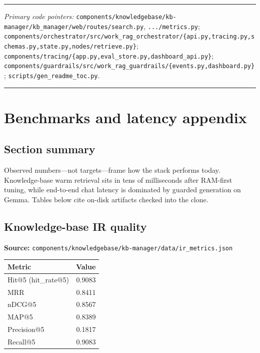 \documentclass[
  11pt,
]{article}
\begin{document}
\begin{center}\rule{0.5\linewidth}{0.5pt}\end{center}

\emph{Primary code pointers:}
\texttt{components/knowledgebase/kb-manager/kb\_manager/web/routes/search.py},
\texttt{.../metrics.py};
\texttt{components/orchestrator/src/work\_rag\_orchestrator/\{api.py,tracing.py,schemas.py,state.py,nodes/retrieve.py\}};
\texttt{components/tracing/\{app.py,eval\_store.py,dashboard\_api.py\}};
\texttt{components/guardrails/src/work\_rag\_guardrails/\{events.py,dashboard.py\}};
\texttt{scripts/gen\_readme\_toc.py}.

\begin{center}\rule{0.5\linewidth}{0.5pt}\end{center}

\section{Benchmarks and latency
appendix}\label{benchmarks-and-latency-appendix}

\subsection{Section summary}\label{section-summary-4}

Observed numbers---not targets---frame how the stack performs today.
Knowledge-base warm retrieval sits in tens of milliseconds after
RAM-first tuning, while end-to-end chat latency is dominated by guarded
generation on Gemma. Tables below cite on-disk artifacts checked into
the clone.

\subsection{Knowledge-base IR quality}\label{knowledge-base-ir-quality}

\textbf{Source:}
\texttt{components/knowledgebase/kb-manager/data/ir\_metrics.json}

\begin{longtable}[]{@{}lr@{}}
\toprule\noalign{}
Metric & Value \\
\midrule\noalign{}
\endhead
\bottomrule\noalign{}
\endlastfoot
Hit@5 (hit\_rate@5) & 0.9083 \\
MRR & 0.8411 \\
nDCG@5 & 0.8567 \\
MAP@5 & 0.8389 \\
Precision@5 & 0.1817 \\
Recall@5 & 0.9083 \\
\end{longtable}
\end{document}
